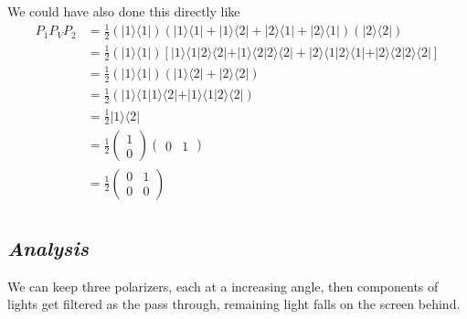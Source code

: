 \documentclass[letter]{article}
\begin{document}
We could have also done this directly like
\begin{align*}
	P_1 P_V P_2 &=  \frac{1}{2}
\left(
	| 1 \rangle \langle 1 | 
\right)
\left( | 1 \rangle \langle 1 | 
+ | 1 \rangle \langle 2 | + | 2 \rangle \langle 1 | + | 2 \rangle \langle 1 | 
\right)
\left(
	| 2 \rangle \langle 2 | 
\right) \\ 
&= \frac{1}{2}
\left(| 1 \rangle \langle 1 | \right)
\left[
	| 1 \rangle \langle 1 | 2 \rangle \langle 2 | + 
	| 1 \rangle \langle 2 | 2 \rangle \langle 2 | + 
	| 2 \rangle \langle 1 | 2 \rangle \langle 1 | + 
	| 2 \rangle \langle 2 | 2 \rangle \langle 2 | 
\right] \\ 
&= 
\frac{1}{2}
\left(| 1 \rangle \langle 1 |  \right) 
\left(
	| 1 \rangle \langle 2 |  + | 2 \rangle \langle 2 | 
\right)
\\ 
&= \frac{1}{2} 
\left(
| 1 \rangle \langle 1  | 1 \rangle \langle 2 |  + 
| 1 \rangle \langle 1 | 2 \rangle \langle 2 | 
\right)\\
&= \frac{1}{2} | 1 \rangle \langle 2 |  \\
&= \frac{1}{2} \begin{pmatrix} 1\\0 \end{pmatrix}
	\begin{pmatrix} 0&1 \end{pmatrix} \\ 
			 &= \frac{1}{2}\begin{pmatrix} 0&1\\0&0 \end{pmatrix}  \\
\end{align*} 



\subsection*{\emph{Analysis}}
We can keep three polarizers, each at a increasing angle, then components of lights get filtered as the pass through, remaining light falls on the screen behind. 
\end{document}
